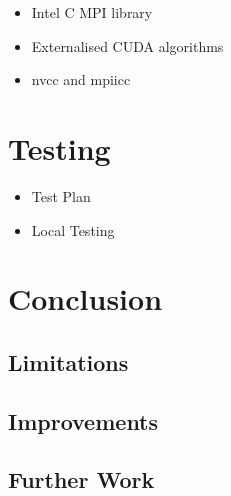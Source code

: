 \documentclass[conference]{IEEEtran}
\begin{document}
\begin{itemize}
    \item Intel C MPI library
    \item Externalised CUDA algorithms
    \item nvcc and mpiicc
\end{itemize}


\section{Testing}

\begin{itemize}
    \item Test Plan
    \item Local Testing
\end{itemize}



\section{Conclusion}

\subsection{Limitations}

\subsection{Improvements}

\subsection{Further Work}




\end{document}
